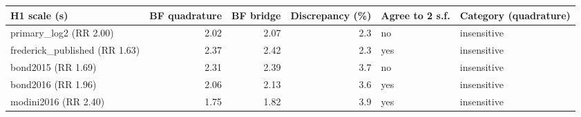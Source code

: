 
\begin{tabular}{lrrrll}
\toprule
H1 scale (s) & BF quadrature & BF bridge & Discrepancy (\%) & Agree to 2 s.f. & Category (quadrature)\\
\midrule
primary\_log2 (RR 2.00) & 2.02 & 2.07 & 2.3 & no & insensitive\\
frederick\_published (RR 1.63) & 2.37 & 2.42 & 2.3 & yes & insensitive\\
bond2015 (RR 1.69) & 2.31 & 2.39 & 3.7 & no & insensitive\\
bond2016 (RR 1.96) & 2.06 & 2.13 & 3.6 & yes & insensitive\\
modini2016 (RR 2.40) & 1.75 & 1.82 & 3.9 & yes & insensitive\\
\bottomrule
\end{tabular}

